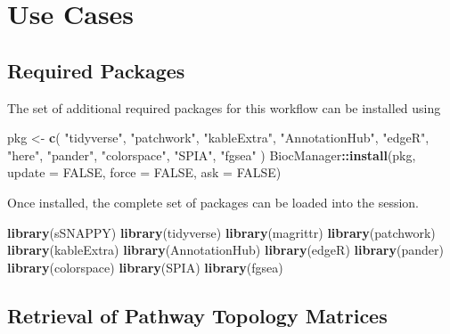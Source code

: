 \documentclass[9pt,a4paper,]{extarticle}
\newenvironment{Shaded}{\begin{snugshade}}{\end{snugshade}}
\newcommand{\AttributeTok}[1]{\textcolor[rgb]{0.13,0.29,0.53}{#1}}
\newcommand{\ConstantTok}[1]{\textcolor[rgb]{0.56,0.35,0.01}{#1}}
\newcommand{\FunctionTok}[1]{\textcolor[rgb]{0.13,0.29,0.53}{\textbf{#1}}}
\newcommand{\NormalTok}[1]{#1}
\newcommand{\OtherTok}[1]{\textcolor[rgb]{0.56,0.35,0.01}{#1}}
\newcommand{\SpecialCharTok}[1]{\textcolor[rgb]{0.81,0.36,0.00}{\textbf{#1}}}
\newcommand{\StringTok}[1]{\textcolor[rgb]{0.31,0.60,0.02}{#1}}
\begin{document}
\hypertarget{use-cases}{%
\section{Use Cases}\label{use-cases}}

\hypertarget{required-packages}{%
\subsection{Required Packages}\label{required-packages}}

The set of additional required packages for this workflow can be installed using

\begin{Shaded}
\begin{Highlighting}[]
\NormalTok{pkg }\OtherTok{\textless{}{-}} \FunctionTok{c}\NormalTok{(}
  \StringTok{"tidyverse"}\NormalTok{, }\StringTok{"patchwork"}\NormalTok{, }\StringTok{"kableExtra"}\NormalTok{, }\StringTok{"AnnotationHub"}\NormalTok{, }\StringTok{"edgeR"}\NormalTok{, }\StringTok{"here"}\NormalTok{, }
  \StringTok{"pander"}\NormalTok{, }\StringTok{"colorspace"}\NormalTok{, }\StringTok{"SPIA"}\NormalTok{, }\StringTok{"fgsea"}
\NormalTok{)}
\NormalTok{BiocManager}\SpecialCharTok{::}\FunctionTok{install}\NormalTok{(pkg, }\AttributeTok{update =} \ConstantTok{FALSE}\NormalTok{, }\AttributeTok{force =} \ConstantTok{FALSE}\NormalTok{, }\AttributeTok{ask =} \ConstantTok{FALSE}\NormalTok{)}
\end{Highlighting}
\end{Shaded}

Once installed, the complete set of packages can be loaded into the session.

\begin{Shaded}
\begin{Highlighting}[]
\FunctionTok{library}\NormalTok{(sSNAPPY)}
\FunctionTok{library}\NormalTok{(tidyverse)}
\FunctionTok{library}\NormalTok{(magrittr)}
\FunctionTok{library}\NormalTok{(patchwork)}
\FunctionTok{library}\NormalTok{(kableExtra)}
\FunctionTok{library}\NormalTok{(AnnotationHub) }
\FunctionTok{library}\NormalTok{(edgeR)}
\FunctionTok{library}\NormalTok{(pander)}
\FunctionTok{library}\NormalTok{(colorspace)}
\FunctionTok{library}\NormalTok{(SPIA)}
\FunctionTok{library}\NormalTok{(fgsea)}
\end{Highlighting}
\end{Shaded}

\hypertarget{retrieval-of-pathway-topology-matrices}{%
\subsection{Retrieval of Pathway Topology Matrices}\label{retrieval-of-pathway-topology-matrices}}
\end{document}
